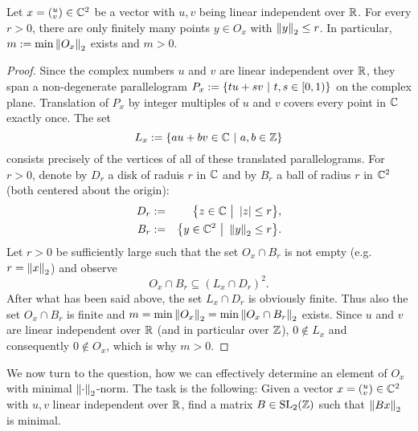 \begin{lemma}
\label{lem_SL2FunDomMinExists}
Let $x = ({}^u_v) \in \mathbb{C}^2$ be a vector with $u,v$ being linear independent over $\mathbb{R}$. For every $r > 0$, there are only finitely many points $y \in O_x$ with $\left\| y \right\|_2 \le r$. In particular, $m := \min{\left\| O_x \right\|_2}$ exists and $m > 0$.
\end{lemma}
\begin{proof}
Since the complex numbers $u$ and $v$ are linear independent over $\mathbb{R}$, they span a non-degenerate parallelogram $P_x := \{ t u + s v \ | \ t,s \in [0,1) \}$ on the complex plane. Translation of $P_x$ by integer multiples of $u$ and $v$ covers every point in $\mathbb{C}$ exactly once. The set
\begin{equation}
L_x := \{ a u + b v \in \mathbb{C} \ | \ a,b \in \mathbb{Z} \}
\end{equation}
consists precisely of the vertices of all of these translated parallelograms. For $r > 0$, denote by $D_r$ a disk of raduis $r$ in $\mathbb{C}$ and by $B_r$ a ball of radius $r$ in $\mathbb{C}^2$ (both centered about the origin):
\begin{eqnarray}
D_r &:=& \big\{ z \in \mathbb{C} \ \big| \ \left|z\right| \le r \big\},\\
B_r &:=& \big\{ y \in \mathbb{C}^2 \ \big| \ \left\| y \right\|_2 \le r \big\}.
\end{eqnarray}
Let $r > 0$ be sufficiently large such that the set $O_x \cap B_r$ is not empty (e.g.\ $r = \left\| x \right\|_2$) and observe
\begin{equation*}
O_x \cap B_r \subseteq (L_x \cap D_r)^2.
\end{equation*}
After what has been said above, the set $L_x \cap D_r$ is obviously finite. Thus also the set $O_x \cap B_r$ is finite and $m = \min{\left\| O_x \right\|_2} = \min{\left\| O_x \cap B_r \right\|_2}$ exists. Since $u$ and $v$ are linear independent over $\mathbb{R}$ (and in particular over $\mathbb{Z}$), $0 \notin L_x$ and consequently $0 \notin O_x$, which is why $m > 0$.
\end{proof}

We now turn to the question, how we can effectively determine an element of $O_x$ with minimal $\left\| \cdot \right\|_2$-norm. The task is the following: Given a vector $x = ({}^u_v) \in \mathbb{C}^2$ with $u,v$ linear independent over $\mathbb{R}$, find a matrix $B \in \operatorname{SL}_{2}(\mathbb{Z})$ such that $\left\| Bx \right\|_2$ is minimal. 

